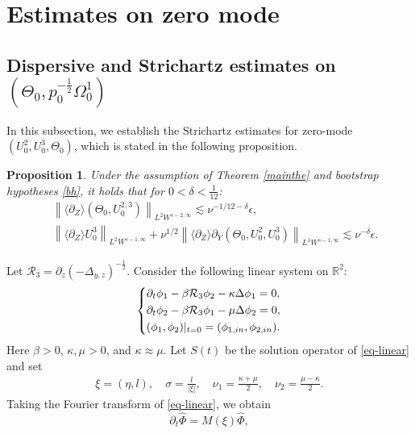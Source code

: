 \documentclass[12pt]{article}
\newcommand{\wtb}{\langle\partial_Z\rangle }
\newcommand{\nm}[2]{\left\| #1 \right\| _{#2} }
\newtheorem{proposition}{Proposition}[section]
\numberwithin{equation}{section}
\begin{document}
	\section{Estimates on zero mode}
	\subsection{Dispersive and Strichartz estimates on $(\Theta_0, p_0^{-\frac{1}{2}} \Omega^1_0)$}
	In this subsection, we establish the Strichartz estimates for zero-mode $(U^2_0,U^3_0,\Theta_0)$, which is stated in the following proposition.
    \begin{proposition}\label{prop-stri}
		Under the assumption of Theorem \eqref{mainthe} and bootstrap hypotheses \eqref{bh}, it holds that for $0<\delta<\frac{1}{12}$:
		\begin{align}
			~&\left\| \wtb (\Theta_0,U_0^{2,3}) \right \|_{L^2 W^{s-2,\infty}} \lesssim \nu^{-1/12-\delta}\epsilon, \label{est-2l}\\
			~& \left\| \wtb U_0^{3} \right \|_{L^2 W^{s-1,\infty}} + \nu^{1/2} \nm{\wtb \partial_Y (\Theta_0, U_0^2,U_0^3)}{L^1 W^{s-1,\infty}} \lesssim  \nu^{-\delta} \epsilon \label{est-3}.
		\end{align}
	\end{proposition}
  	Let $\mathcal{R}_3=\partial_z(-\Delta_{y,z})^{-\frac{1}{2}}$. Consider the following linear system on $\mathbb{R}^2$:
  	\begin{equation}\label{eq-linear}
  		\left\{\begin{aligned}
  			&\partial_t \phi_1-\beta \mathcal{R}_3 \phi_2-\kappa\Delta \phi_1=0,\\
  			&\partial_t \phi_2-\beta \mathcal{R}_3 \phi_1-\mu\Delta \phi_2=0,\\
  			&(\phi_1,\phi_2)|_{t=0}=(\phi_{1,in},\phi_{2,in}).
  		\end{aligned}\\
  		         \right.
  	\end{equation}
  	Here $\beta>0$, $\kappa,\mu>0$, and $\kappa\approx\mu$. Let $S(t)$ be the solution operator of \eqref{eq-linear} and set
    \begin{align*}
        \xi=(\eta,l),\quad \sigma=\frac{l}{|\xi|},\quad \nu_1=\frac{\kappa+\mu}{2},\quad \nu_2=\frac{\mu-\kappa}{2}.
    \end{align*}
    Taking the Fourier transform of 
  	\eqref{eq-linear}, we obtain
  	\begin{equation*}
  		\partial_t \hat\Phi=M(\xi)\hat\Phi,
  	\end{equation*}
\end{document}
